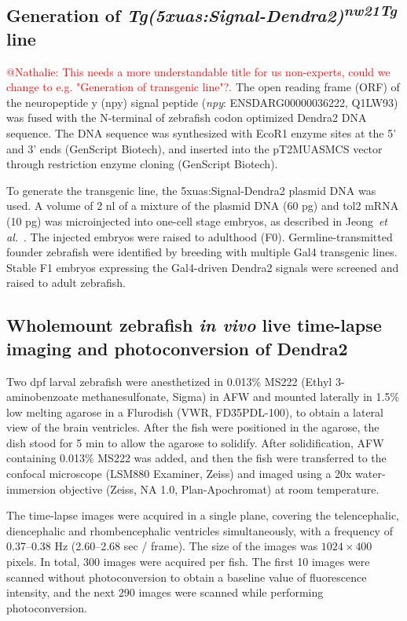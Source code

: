 \documentclass[fleqn]{wlscirep}
\newcommand{\fixme}[1]{\textcolor{red}{#1}}
\begin{document}
\subsection*{Generation of \emph{Tg(5xuas:Signal-Dendra2)\textsuperscript{nw21Tg}} line}
\fixme{@Nathalie: This needs a more understandable title for us non-experts, could we change to
e.g. "Generation of transgenic line"?.}
The open reading frame (ORF) of the neuropeptide y (npy) signal peptide
(\emph{npy}: ENSDARG00000036222, Q1LW93) was fused with the N-terminal
of zebrafish codon optimized Dendra2 DNA sequence.
The DNA sequence was synthesized with EcoR1 enzyme sites at the 5’ and
3’ ends (GenScript Biotech), and inserted into the
pT2MUASMCS vector~\cite{Asakawa2008GeneticZebrafish}
through restriction enzyme cloning (GenScript Biotech). 

To generate the transgenic line, the 5xuas:Signal-Dendra2 plasmid DNA was used.
A volume of 2 nl of a mixture of the plasmid DNA (60 pg) and tol2 mRNA (10 pg)
was microinjected into one-cell stage embryos,
as described in Jeong~\emph{et al.}~\cite{Jeong2024TheZebrafish}. The injected
embryos were raised to adulthood (F0).
Germline-transmitted founder zebrafish were identified by breeding with
multiple Gal4 transgenic lines. Stable F1 embryos expressing the Gal4-driven
Dendra2 signals were screened and raised to adult zebrafish.

\subsection*{Wholemount zebrafish \emph{in vivo} live time-lapse imaging and photoconversion of Dendra2}
Two dpf larval zebrafish were anesthetized in 0.013\% MS222
(Ethyl 3-aminobenzoate methanesulfonate, Sigma) in AFW and
mounted laterally in 1.5\% low melting agarose in a Flurodish (VWR, FD35PDL-100),
to obtain a lateral view of the brain ventricles. After the
fish were positioned in the agarose, the dish stood for 5 min to allow the agarose to solidify.
After solidification, AFW containing 0.013\% MS222 was added,
and then the fish were transferred to the confocal microscope (LSM880 Examiner, Zeiss)
and imaged using a 20x water-immersion objective (Zeiss, NA 1.0, Plan-Apochromat)
at room temperature.

The time-lapse images were acquired in a single plane, covering the
telencephalic, diencephalic and rhombencephalic ventricles simultaneously,
with a frequency of 0.37--0.38 Hz (2.60--2.68 sec / frame). The size
of the images was $1024\times400$ pixels. In total, 300 images were acquired per fish.
The first 10 images were scanned without photoconversion to obtain a
baseline value of fluorescence intensity, and the next 290 images were
scanned while performing photoconversion. 
\end{document}
